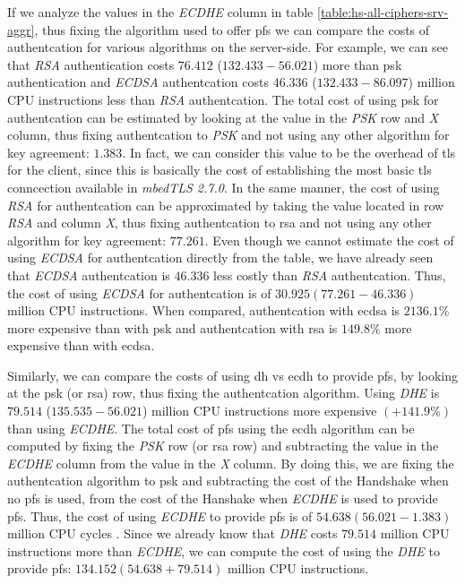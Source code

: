 \documentclass{llncs}
\begin{document}
If we analyze the values in the \textit{ECDHE} column in table \ref{table:hs-all-ciphers-srv-aggr}, thus fixing the
algorithm used to offer \gls{pfs} we can compare the costs of authentcation for various algorithms on the server-side.
For example, we can see that \textit{RSA} authentication costs $76.412$ ($132.433-56.021$) more than \gls{psk} 
authentication and \textit{ECDSA} authentcation costs $46.336$ ($132.433-86.097$) million CPU instructions less 
than \textit{RSA} authentcation. The total cost of using \gls{psk} for authentcation can be estimated 
by looking at the
value in the \textit{PSK} row and \textit{X} column, thus fixing authentcation to \textit{PSK} and not using any other
algorithm for key agreement: $1.383$. In fact, we can consider this value to be the overhead of \gls{tls} for the client,
since this is basically the cost of establishing the most basic \gls{tls} conncection available in \textit{mbedTLS 2.7.0}. 
In the same manner, the cost of using \textit{RSA} for authentcation can
be approximated by taking the value located in row \textit{RSA} and column \textit{X}, thus fixing authentcation
to \gls{rsa} and not using any other algorithm for key agreement: $77.261$. Even though we cannot estimate the cost
of using \textit{ECDSA} for authentcation directly from the table, we have already seen that \textit{ECDSA} authentcation
is $46.336$ less costly than \textit{RSA} authentcation. Thus, the cost of using \textit{ECDSA} for authentcation
is of $30.925 (77.261-46.336)$ million CPU instructions. When compared, authentcation with \gls{ecdsa} is
$2136.1\%$ more expensive than with \gls{psk} and authentcation with \gls{rsa} is $149.8\%$ more expensive 
than with \gls{ecdsa}.

Similarly, we can compare the costs of using \gls{dh} vs \gls{ecdh} to provide \gls{pfs}, by
looking at the \gls{psk} (or \gls{rsa}) row, thus fixing the authentcation algorithm. Using \textit{DHE} is 
$79.514$ ($135.535 - 56.021$) million CPU instructions more expensive $(+141.9\%)$ than using \textit{ECDHE}. The total cost of \gls{pfs}
using the \gls{ecdh} algorithm can be computed by fixing the \textit{PSK} row (or \gls{rsa} row) 
and subtracting the value in the \textit{ECDHE} column from the value in the \textit{X} column. By doing this, we are 
fixing the authentcation algorithm to \gls{psk} and subtracting the cost of the Handshake when no \gls{pfs} is used, 
from the cost of the Hanshake when \textit{ECDHE} is used to provide \gls{pfs}. Thus, the cost of using \textit{ECDHE}
to provide \gls{pfs} is of $54.638 (56.021-1.383)$ million CPU cycles . Since we already know that \textit{DHE} costs
$79.514$ million CPU instructions more than \textit{ECDHE}, we can compute the cost of using the \textit{DHE} to
provide \gls{pfs}: $134.152 (54.638+79.514)$ million CPU instructions.
\end{document}
